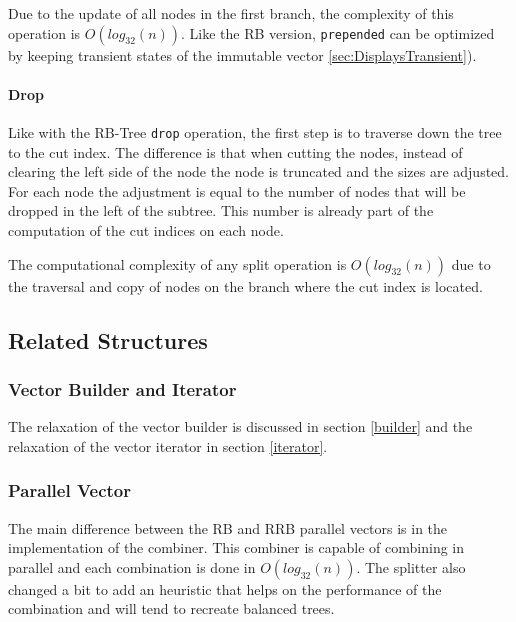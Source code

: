 Due to the update of all nodes in the first branch, the complexity of this operation is $O(log_{32}(n))$. Like the RB version, \texttt{prepended} can be optimized by keeping transient states of the immutable vector \ref{sec:DisplaysTransient}).


\paragraph{Drop}

Like with the RB-Tree \texttt{drop} operation, the first step is to traverse down the tree to the cut index. The difference is that when cutting the nodes, instead of clearing the left side of the node the node is truncated and the sizes are adjusted. For each node the adjustment is equal to the number of nodes that will be dropped in the left of the subtree. This number is already part of the computation of the cut indices on each node.  

The computational complexity of any split operation is $O(log_{32}(n))$ due to the traversal and copy of nodes on the branch where the cut index is located.


\subsection{Related Structures}

\subsubsection{Vector Builder and Iterator}
The relaxation of the vector builder is discussed in section \ref{builder} and the relaxation of the vector iterator in section \ref{iterator}.

\subsubsection{Parallel Vector}
The main difference between the RB and RRB parallel vectors is in the implementation of the combiner. This combiner is capable of combining in parallel and each combination is done in $O(log_{32}(n))$. The splitter also changed a bit to add an heuristic that helps on the performance of the combination and will tend to recreate balanced trees. 

